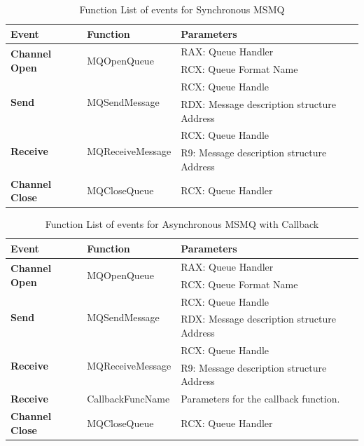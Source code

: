     \begin{table}[H]
        \centering
        \caption{Function List  of events for Synchronous MSMQ}
        \label{msmqsynfunctions}
        \begin{tabular}{|l|l|l|}
            \hline
             \textbf{Event} & \textbf{Function}& \textbf{Parameters}  \\
             \hline
             \multirow{2}{*}{{\textbf{Channel Open}}}
             &\multirow{2}{*}{{MQOpenQueue}} &  RAX: Queue Handler\\
              \cline{3-3} 
             & &  RCX: Queue Format Name\\
            \hline
             \multirow{2}{*}{{\textbf{Send}}}
             &\multirow{2}{*}{MQSendMessage} &  RCX: Queue Handle \\
              \cline{3-3} 
             &&  RDX: Message description structure Address \\
            \hline
             \multirow{2}{*}{{\textbf{Receive}}}
             & \multirow{2}{*}{MQReceiveMessage}&  RCX: Queue Handle \\
              \cline{3-3} 
              &&  R9: Message description structure Address \\
            \hline
            \textbf{Channel Close} &MQCloseQueue & RCX: Queue Handler \\
            \hline
        \end{tabular}
    \end{table}


    \begin{table}[H]
        \centering
        \caption{Function List of events for Asynchronous MSMQ with Callback}
        \label{msmqasynfunctionscallback}
        \begin{tabular}{|l|l|l|}
            \hline
             \textbf{Event} & \textbf{Function}& \textbf{Parameters}  \\
             \hline
             \multirow{2}{*}{{\textbf{Channel Open}}}
             &\multirow{2}{*}{{MQOpenQueue}} &  RAX: Queue Handler\\
              \cline{3-3} 
             & &  RCX: Queue Format Name\\
            \hline
             \multirow{2}{*}{\textbf{Send}}
             &\multirow{2}{*}{MQSendMessage} &  RCX: Queue Handle \\
              \cline{3-3} 
             &&  RDX: Message description structure Address \\
            \hline
             \multirow{2}{*}{\textbf{Receive}}
             & \multirow{2}{*}{MQReceiveMessage}&  RCX: Queue Handle \\
              \cline{3-3} 
              &&  R9: Message description structure Address \\
             \hline
             \textbf{Receive}
              &CallbackFuncName&  Parameters for the callback function. \\
            \hline
            \textbf{Channel Close} &MQCloseQueue & RCX: Queue Handler \\
            \hline
        \end{tabular}
    \end{table}

